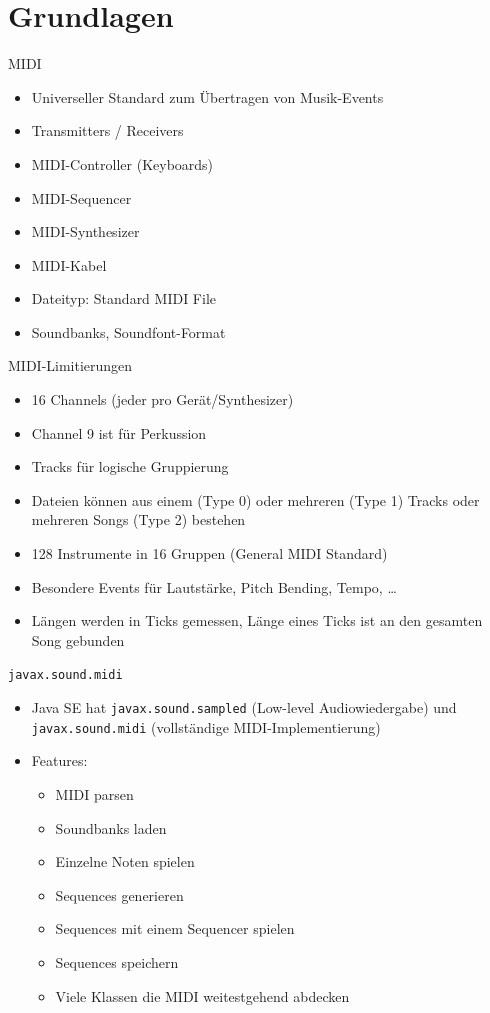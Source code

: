 \documentclass[presentation]{beamer}
\begin{document}
\section{Grundlagen}
\label{sec-2}

\begin{frame}[label=sec-2-1]{MIDI}
\begin{itemize}
\item Universeller Standard zum Übertragen von Musik-Events
\item Transmitters / Receivers
\item MIDI-Controller (Keyboards)
\item MIDI-Sequencer
\item MIDI-Synthesizer
\item MIDI-Kabel
\item Dateityp: Standard MIDI File
\item Soundbanks, Soundfont-Format
\end{itemize}
\end{frame}

\begin{frame}[label=sec-2-2]{MIDI-Limitierungen}
\begin{itemize}
\item 16 Channels (jeder pro Gerät/Synthesizer)
\item Channel 9 ist für Perkussion
\item Tracks für logische Gruppierung
\item Dateien können aus einem (Type 0) oder mehreren (Type 1) Tracks
oder mehreren Songs (Type 2) bestehen
\item 128 Instrumente in 16 Gruppen (General MIDI Standard)
\item Besondere Events für Lautstärke, Pitch Bending, Tempo, \ldots{}
\item Längen werden in Ticks gemessen, Länge eines Ticks ist an den
gesamten Song gebunden
\end{itemize}
\end{frame}

\begin{frame}[fragile,label=sec-2-3]{\texttt{javax.sound.midi}}
 \begin{itemize}
\item Java SE hat \texttt{javax.sound.sampled} (Low-level Audiowiedergabe) und
\texttt{javax.sound.midi} (vollständige MIDI-Implementierung)
\item Features:
\begin{itemize}
\item MIDI parsen
\item Soundbanks laden
\item Einzelne Noten spielen
\item Sequences generieren
\item Sequences mit einem Sequencer spielen
\item Sequences speichern
\item Viele Klassen die MIDI weitestgehend abdecken
\end{itemize}
\end{itemize}
\end{frame}
\end{document}
